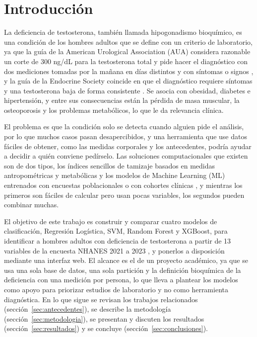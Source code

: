 \documentclass[conference]{IEEEtran}
\begin{document}
\section{Introducción}

La deficiencia de testosterona, también llamada hipogonadismo bioquímico, es una condición de los hombres adultos que se define con un criterio de laboratorio, ya que la guía de la American Urological Association (AUA) considera razonable un corte de 300 ng/dL para la testosterona total y pide hacer el diagnóstico con dos mediciones tomadas por la mañana en días distintos y con síntomas o signos \cite{mulhall2018}, y la guía de la Endocrine Society coincide en que el diagnóstico requiere síntomas y una testosterona baja de forma consistente \cite{bhasin2018}. Se asocia con obesidad, diabetes e hipertensión, y entre sus consecuencias están la pérdida de masa muscular, la osteoporosis y los problemas metabólicos, lo que le da relevancia clínica.

El problema es que la condición solo se detecta cuando alguien pide el análisis, por lo que muchos casos pasan desapercibidos, y una herramienta que use datos fáciles de obtener, como las medidas corporales y los antecedentes, podría ayudar a decidir a quién conviene pedírselo. Las soluciones computacionales que existen son de dos tipos, los índices sencillos de tamizaje basados en medidas antropométricas y metabólicas \cite{zhang2025, guo2025, xu2024} y los modelos de Machine Learning (ML) entrenados con encuestas poblacionales o con cohortes clínicas \cite{yu2025, novaes2021, kivrak2024}, y mientras los primeros son fáciles de calcular pero usan pocas variables, los segundos pueden combinar muchas.

El objetivo de este trabajo es construir y comparar cuatro modelos de clasificación, Regresión Logística, SVM, Random Forest y XGBoost, para identificar a hombres adultos con deficiencia de testosterona a partir de 13 variables de la encuesta NHANES 2021 a 2023 \cite{cdc_nhanes}, y ponerlos a disposición mediante una interfaz web. El alcance es el de un proyecto académico, ya que se usa una sola base de datos, una sola partición y la definición bioquímica de la deficiencia con una medición por persona, lo que lleva a plantear los modelos como apoyo para priorizar estudios de laboratorio y no como herramienta diagnóstica. En lo que sigue se revisan los trabajos relacionados (sección~\ref{sec:antecedentes}), se describe la metodología (sección~\ref{sec:metodologia}), se presentan y discuten los resultados (sección~\ref{sec:resultados}) y se concluye (sección~\ref{sec:conclusiones}).
\end{document}
